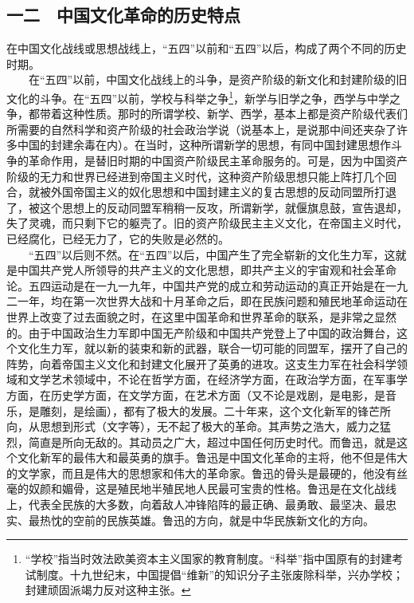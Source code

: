 \documentclass[cn,11pt,chinese]{elegantbook}
\def\myformat#1{\hfil\hfil #1}
\begin{document}
\subsection*{\myformat{一二　中国文化革命的历史特点}}
在中国文化战线或思想战线上，“五四”以前和“五四”以后，构成了两个不同的历史时期。\\
　　在“五四”以前，中国文化战线上的斗争，是资产阶级的新文化和封建阶级的旧文化的斗争。在“五四”以前，学校与科举之争\footnote[27]{ “学校”指当时效法欧美资本主义国家的教育制度。“科举”指中国原有的封建考试制度。十九世纪末，中国提倡“维新”的知识分子主张废除科举，兴办学校；封建顽固派竭力反对这种主张。}，新学与旧学之争，西学与中学之争，都带着这种性质。那时的所谓学校、新学、西学，基本上都是资产阶级代表们所需要的自然科学和资产阶级的社会政治学说（说基本上，是说那中间还夹杂了许多中国的封建余毒在内）。在当时，这种所谓新学的思想，有同中国封建思想作斗争的革命作用，是替旧时期的中国资产阶级民主革命服务的。可是，因为中国资产阶级的无力和世界已经进到帝国主义时代，这种资产阶级思想只能上阵打几个回合，就被外国帝国主义的奴化思想和中国封建主义的复古思想的反动同盟所打退了，被这个思想上的反动同盟军稍稍一反攻，所谓新学，就偃旗息鼓，宣告退却，失了灵魂，而只剩下它的躯壳了。旧的资产阶级民主主义文化，在帝国主义时代，已经腐化，已经无力了，它的失败是必然的。\\
　　“五四”以后则不然。在“五四”以后，中国产生了完全崭新的文化生力军，这就是中国共产党人所领导的共产主义的文化思想，即共产主义的宇宙观和社会革命论。五四运动是在一九一九年，中国共产党的成立和劳动运动的真正开始是在一九二一年，均在第一次世界大战和十月革命之后，即在民族问题和殖民地革命运动在世界上改变了过去面貌之时，在这里中国革命和世界革命的联系，是非常之显然的。由于中国政治生力军即中国无产阶级和中国共产党登上了中国的政治舞台，这个文化生力军，就以新的装束和新的武器，联合一切可能的同盟军，摆开了自己的阵势，向着帝国主义文化和封建文化展开了英勇的进攻。这支生力军在社会科学领域和文学艺术领域中，不论在哲学方面，在经济学方面，在政治学方面，在军事学方面，在历史学方面，在文学方面，在艺术方面（又不论是戏剧，是电影，是音乐，是雕刻，是绘画），都有了极大的发展。二十年来，这个文化新军的锋芒所向，从思想到形式（文字等），无不起了极大的革命。其声势之浩大，威力之猛烈，简直是所向无敌的。其动员之广大，超过中国任何历史时代。而鲁迅，就是这个文化新军的最伟大和最英勇的旗手。鲁迅是中国文化革命的主将，他不但是伟大的文学家，而且是伟大的思想家和伟大的革命家。鲁迅的骨头是最硬的，他没有丝毫的奴颜和媚骨，这是殖民地半殖民地人民最可宝贵的性格。鲁迅是在文化战线上，代表全民族的大多数，向着敌人冲锋陷阵的最正确、最勇敢、最坚决、最忠实、最热忱的空前的民族英雄。鲁迅的方向，就是中华民族新文化的方向。\\
\end{document}
